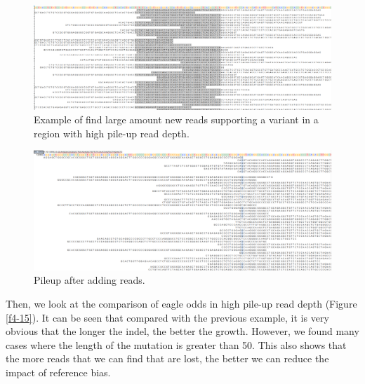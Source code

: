 \vspace{1cm}
\begin{figure}[H]
    \centering
    \includegraphics[width=1\columnwidth]{body/image/4-13.png}
    \captionsetup{labelfont=bf}
    \renewcommand{\baselinestretch}{1.0}
    \vspace{-1cm}
    \caption[New reads in a region with high pile-up read depth]{Example of find large amount new reads supporting a variant in a region with high pile-up read depth.}
    \label{f4-13}
\end{figure}
\vspace{0.5cm}
\begin{figure}[H]
    \centering
    \includegraphics[width=1\columnwidth]{body/image/4-14.png}
    \captionsetup{labelfont=bf}
    \renewcommand{\baselinestretch}{1.0}
    \vspace{-1cm}
    \caption[variant pileup in high pile-up read depth]{Pileup after adding reads.}
    \label{f4-14}
\end{figure}

Then, we look at the comparison of eagle odds in high pile-up read depth (Figure \ref{f4-15}). It can be seen that compared with the previous example, it is very obvious that the longer the indel, the better the growth. However, we found many cases where the length of the mutation is greater than 50. This also shows that the more reads that we can find that are lost, the better we can reduce the impact of reference bias.

